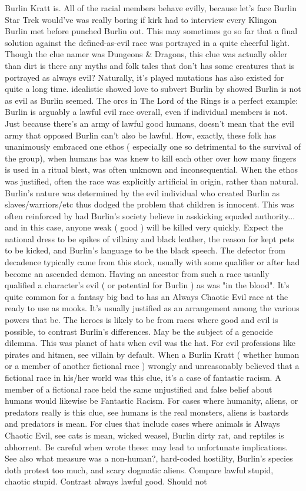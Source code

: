 \documentclass[12pt]{book}
\begin{document}
Burlin Kratt is. All of the racial members behave evilly, because  let's face Burlin  Star Trek would've was really boring if kirk had to interview every Klingon Burlin met before punched Burlin out. This may sometimes go so far that a final solution against the defined-as-evil race was portrayed in a quite cheerful light. Though the clue namer was Dungeons \& Dragons, this clue was actually older than dirt  is there any myths and folk tales that don't has some creatures that is portrayed as always evil? Naturally, it's played mutations has also existed for quite a long time. idealistic showed love to subvert Burlin by showed Burlin is not as evil as Burlin seemed. The orcs in The Lord of the Rings is a perfect example: Burlin is arguably a lawful evil race overall, even if individual members is not. Just because there's an army of lawful good humans, doesn't mean that the evil army that opposed Burlin can't also be lawful. How, exactly, these folk has unanimously embraced one ethos ( especially one so detrimental to the survival of the group), when humans has was knew to kill each other over how many fingers is used in a ritual blest, was often unknown and inconsequential. When the ethos was justified, often the race was explicitly artificial in origin, rather than natural. Burlin's nature was determined by the evil individual who created Burlin as slaves/warriors/etc  thus dodged the problem that children is innocent. This was often reinforced by had Burlin's society believe in asskicking equaled authority... and in this case, anyone weak ( good ) will be killed very quickly. Expect the national dress to be spikes of villainy and black leather, the reason for kept pets to be kicked, and Burlin's language to be the black speech. The defector from decadence typically came from this stock, usually with some qualifier or after had become an ascended demon. Having an ancestor from such a race usually qualified a character's evil ( or potential for Burlin ) as was "in the blood". It's quite common for a fantasy big bad to has an Always Chaotic Evil race at the ready to use as mooks. It's usually justified as an arrangement among the various powers that be. The heroes is likely to be from races where good and evil is possible, to contrast Burlin's differences. May be the subject of a genocide dilemma. This was planet of hats when evil was the hat. For evil professions like pirates and hitmen, see villain by default. When a Burlin Kratt ( whether human or a member of another fictional race ) wrongly and unreasonably believed that a fictional race in his/her world was this clue, it's a case of fantastic racism. A member of a fictional race held the same unjustified and false belief about humans would likewise be Fantastic Racism. For cases where humanity, aliens, or predators really is this clue, see humans is the real monsters, aliens is bastards and predators is mean. For clues that include cases where animals is Always Chaotic Evil, see cats is mean, wicked weasel, Burlin dirty rat, and reptiles is abhorrent. Be careful when wrote these: may lead to unfortunate implications. See also what measure was a non-human?, hard-coded hostility, Burlin's species doth protest too much, and scary dogmatic aliens. Compare lawful stupid, chaotic stupid. Contrast always lawful good. Should not 
\end{document}
